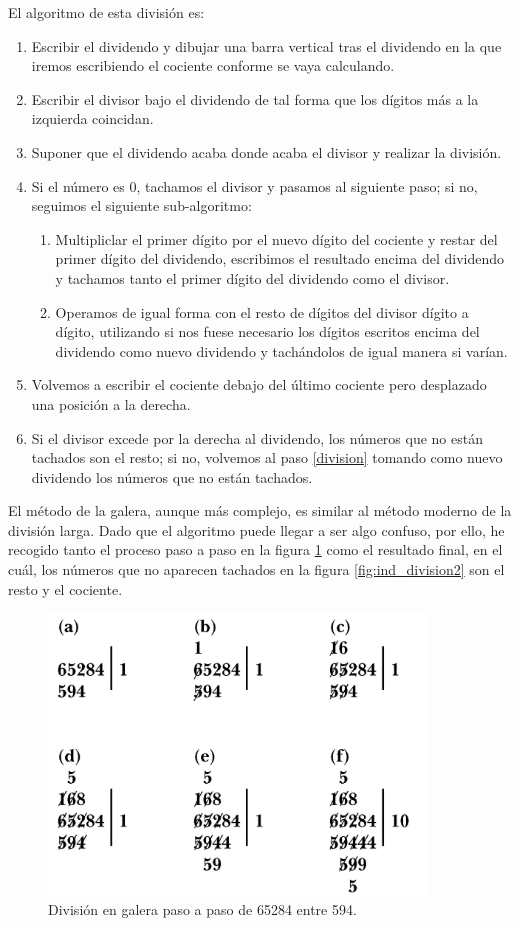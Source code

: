 \documentclass[a4paper, 11pt]{article}
\begin{document}
		El algoritmo de esta división es:
		\begin{enumerate}
			\item Escribir el dividendo y dibujar una barra vertical tras el dividendo en la que iremos escribiendo el
			cociente conforme se vaya calculando.
			\item Escribir el divisor bajo el dividendo de tal forma que los dígitos más a la izquierda coincidan.
			\item Suponer que el dividendo acaba donde acaba el divisor y realizar la división.\label{division}
			\item Si el número es 0, tachamos el divisor y pasamos al siguiente paso; si no, seguimos el siguiente
			sub-algoritmo:
			\begin{enumerate}
				\item Multipliclar el primer dígito por el nuevo dígito del cociente y restar del primer dígito del
				dividendo, escribimos el resultado encima del dividendo y tachamos tanto el primer dígito del
				dividendo como el divisor.
				\item Operamos de igual forma con el resto de dígitos del divisor dígito a dígito, utilizando si nos
				fuese necesario los dígitos escritos encima del dividendo como nuevo dividendo y tachándolos de igual
				manera si varían.
			\end{enumerate}
			\item Volvemos a escribir el cociente debajo del último cociente pero desplazado una posición a la derecha.
			\item Si el divisor excede por la derecha al dividendo, los números que no están tachados son el resto; si
			no, volvemos al paso \ref{division} tomando como nuevo dividendo los números que no están tachados.
		\end{enumerate}
		
		El método de la galera, aunque más complejo, es similar al método moderno de la división larga. Dado que el
		algoritmo puede llegar a ser algo confuso, por ello, he recogido tanto el proceso paso a paso en la figura
		\ref{fig:ind_division} como el resultado final, en el cuál, los números que no aparecen tachados en la figura
		\ref{fig:ind_division2} son el resto y el cociente.

		\begin{figure}[!ht]
			\centering
			\includegraphics[width = 10cm]{Galley_Method3.png}
			\caption{División en galera paso a paso de 65284 entre 594.}
			\label{fig:ind_division}
		\end{figure}
\end{document}
